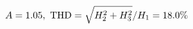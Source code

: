 \documentclass[preview]{standalone}
\begin{document}
\begin{align*}
\special{dvisvgm:raw <g id='unique000'>}A=1.05,\ \text{THD}=\sqrt{H_2^2+H_3^2}/H_1=18.0\%\special{dvisvgm:raw </g>}
\end{align*}
\end{document}
